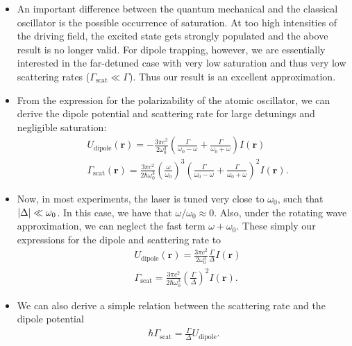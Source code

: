\documentclass{report}
\theoremstyle{definition}
\newcommand{\f}[2]{\frac{#1}{#2}}
\newcommand{\lp}{\left(}
\newcommand{\rp}{\right)}
\begin{document}
\begin{itemize}
\begin{itemize}
		\item An important difference between the quantum mechanical and the classical oscillator is the possible occurrence of saturation. At too high intensities of the driving field, the excited state gets strongly populated and the above result is no longer valid. For dipole trapping, however, we are essentially interested in the far-detuned case with very low saturation and thus very
		low scattering rates ($\Gamma_\text{scat} \ll \Gamma$). Thus our result is an excellent approximation. 
		
		
		\item From the expression for the polarizability of the atomic oscillator, we can derive the dipole potential and scattering rate for large detunings and negligible saturation:
		\begin{align}
		&U_\text{dipole}(\mathbf{r}) = -\f{3\pi c^2}{2\omega_0^3}\lp \f{\Gamma}{\omega_0 - \omega} + \f{\Gamma}{\omega_0 + \omega}\rp I(\mathbf{r})\\
		&\Gamma_\text{scat}(\mathbf{r}) = \f{3\pi c^2}{2\hbar \omega_0^3}\lp \f{\omega}{\omega_0} \rp^3 \lp \f{\Gamma}{\omega_0 - \omega} + \f{\Gamma}{\omega_0 + \omega}\rp^2 I(\mathbf{r}).
		\end{align}
		
		
		
		\item Now, in most experiments, the laser is tuned very close to $\omega_0$, such that $\abs{\Delta} \ll \omega_0$. In this case, we have that $\omega/\omega_0 \approx 0$. Also, under the rotating wave approximation, we can neglect the fast term $\omega+ \omega_0$. These simply our expressions for the dipole and scattering rate to
		\begin{align}
		&U_\text{dipole}(\mathbf{r}) = \f{3\pi c^2}{2\omega_0^3}\f{\Gamma}{\Delta}I(\mathbf{r})\\
		&\Gamma_\text{scat} = \f{3\pi c^2}{2\hbar \omega_0^3}\lp \f{\Gamma}{\Delta} \rp^2I(\mathbf{r}).
		\end{align}
		
		\item We can also derive a simple relation between the scattering rate and the dipole potential
		\begin{align}
		\hbar \Gamma_\text{scat} = \f{\Gamma}{\Delta}U_\text{dipole}.
		\end{align}
		

\end{itemize}
\end{itemize}
\end{document}
